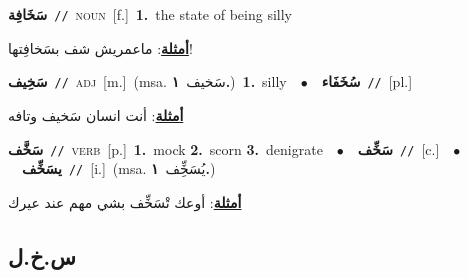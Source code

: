\documentclass[10pt,a4paper,twoside]{article} %
\begin{document}
\begin{multicols}{2}
{\setlength\topsep{0pt}\textbf{\foreignlanguage{arabic}{سَخَافِة}}\ {\color{gray}\texttt{//}\color{black}}\ \textsc{noun}\ [f.]\ \textbf{1.}~the state of being silly\  \begin{flushright}\color{gray}\foreignlanguage{arabic}{\textbf{\underline{\foreignlanguage{arabic}{أمثلة}}}: ماعمريش شف بسَخافِتها!}\end{flushright}\color{black}} \vspace{2mm}

{\setlength\topsep{0pt}\textbf{\foreignlanguage{arabic}{سَخِيف}}\ {\color{gray}\texttt{//}\color{black}}\ \textsc{adj}\ [m.]\ \color{gray}(msa. \foreignlanguage{arabic}{سَخيف}~\foreignlanguage{arabic}{\textbf{١.}})\color{black}\ \textbf{1.}~silly\ \ $\bullet$\ \ \setlength\topsep{0pt}\textbf{\foreignlanguage{arabic}{سُخَفَاء}}\ {\color{gray}\texttt{//}\color{black}}\ [pl.]\  \begin{flushright}\color{gray}\foreignlanguage{arabic}{\textbf{\underline{\foreignlanguage{arabic}{أمثلة}}}: أنت انسان سَخيف وتافه}\end{flushright}\color{black}} \vspace{2mm}

{\setlength\topsep{0pt}\textbf{\foreignlanguage{arabic}{سَخَّف}}\ {\color{gray}\texttt{//}\color{black}}\ \textsc{verb}\ [p.]\ \textbf{1.}~mock  \textbf{2.}~scorn  \textbf{3.}~denigrate\ \ $\bullet$\ \ \setlength\topsep{0pt}\textbf{\foreignlanguage{arabic}{سَخِّف}}\ {\color{gray}\texttt{//}\color{black}}\ [c.]\ \ $\bullet$\ \ \setlength\topsep{0pt}\textbf{\foreignlanguage{arabic}{يسَخِّف}}\ {\color{gray}\texttt{//}\color{black}}\ [i.]\ \color{gray}(msa. \foreignlanguage{arabic}{يُسَخِِّف}~\foreignlanguage{arabic}{\textbf{١.}})\color{black}\  \begin{flushright}\color{gray}\foreignlanguage{arabic}{\textbf{\underline{\foreignlanguage{arabic}{أمثلة}}}: أوعك تْسَخِّف بشي مهم عند عيرك}\end{flushright}\color{black}} \vspace{2mm}

\vspace{-3mm}
\subsection*{\color{blue}\foreignlanguage{arabic}{س.خ.ل}\color{blue}{}} 


\end{multicols}
\end{document}
